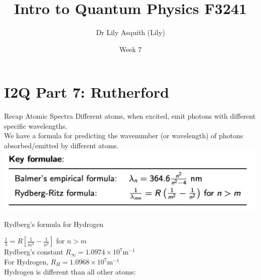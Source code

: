 


% 
\title[ Intro to Quantum Physics]{Intro to Quantum Physics F3241}
\author[Dr Lily Asquith (Lily)]{ Dr Lily Asquith (Lily)}
\date[Week 7]{ Week 7}





\begin{frame}
\titlepage
\end{frame} 


\section{I2Q Part 7: Rutherford}
 
 \begin{frame}{Recap Atomic Spectra}
\small
Different atoms, when excited, emit photons with different specific wavelengths.\\[1ex]

We have a formula for predicting the wavenumber (or wavelength) of photons absorbed/emitted by different atoms.\\[1ex]

\includegraphics[scale=0.4]{recap-spectra}

\end{frame}

 \begin{frame}{Rydberg's formula for Hydrogen}
 \large

$\frac{1}{\lambda} = R[\frac{1}{m^2} - \frac{1}{n^2} ]$ for $n>m$\\[3ex]

\small
Rydberg's constant $R_{\infty} = 1.0974 \times 10^7$m$^{-1}$\\[3ex]

For Hydrogen, $R_{H} = 1.0968 \times 10^7$m$^{-1}$\\[3ex]

Hydrogen is different than all other atoms:\\[10ex]




\end{frame}

